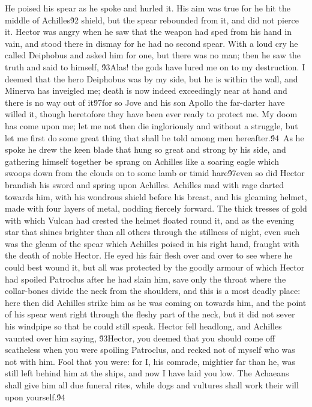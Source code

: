{He poised his spear as he spoke and hurled it. His aim was true for he hit the middle of Achilles\'92 shield, but the spear rebounded from it, and did not pierce it. Hector was angry when he saw that the weapon had sped from his hand in vain, and stood there in dismay for he had no second spear. With a loud cry he called Deiphobus and asked him for one, but there was no man; then he saw the truth and said to himself, \'93Alas! the gods have lured me on to my destruction. I deemed that the hero Deiphobus was by my side, but he is within the wall, and Minerva has inveigled me; death is now indeed exceedingly near at hand and there is no way out of it\'97for so Jove and his son Apollo the far-darter have willed it, though heretofore they have been ever ready to protect me. My doom has come upon me; let me not then die ingloriously and without a struggle, but let me first do some great thing that shall be told among men hereafter.\'94\
As he spoke he drew the keen blade that hung so great and strong by his side, and gathering himself together be sprang on Achilles like a soaring eagle which swoops down from the clouds on to some lamb or timid hare\'97even so did Hector brandish his sword and spring upon Achilles. Achilles mad with rage darted towards him, with his wondrous shield before his breast, and his gleaming helmet, made with four layers of metal, nodding fiercely forward. The thick tresses of gold with which Vulcan had crested the helmet floated round it, and as the evening star that shines brighter than all others through the stillness of night, even such was the gleam of the spear which Achilles poised in his right hand, fraught with the death of noble Hector. He eyed his fair flesh over and over to see where he could best wound it, but all was protected by the goodly armour of which Hector had spoiled Patroclus after he had slain him, save only the throat where the collar-bones divide the neck from the shoulders, and this is a most deadly place: here then did Achilles strike him as he was coming on towards him, and the point of his spear went right through the fleshy part of the neck, but it did not sever his windpipe so that he could still speak. Hector fell headlong, and Achilles vaunted over him saying, \'93Hector, you deemed that you should come off scatheless when you were spoiling Patroclus, and recked not of myself who was not with him. Fool that you were: for I, his comrade, mightier far than he, was still left behind him at the ships, and now I have laid you low. The Achaeans shall give him all due funeral rites, while dogs and vultures shall work their will upon yourself.\'94\
}
